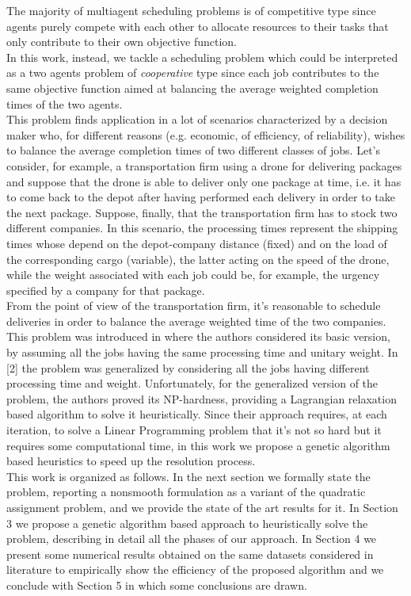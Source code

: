 \documentclass[opre,nonblindrev]{informs3} %
\begin{document}
 The majority of multiagent scheduling problems is of competitive type since agents purely compete with each other to allocate resources to their tasks that only contribute to their own objective function.\\ In this work, instead, we tackle a scheduling problem which could be interpreted as a two agents problem of \textit{cooperative} type since each job contributes to the same objective function aimed at balancing the average weighted completion times of the two agents.\\
This problem finds application in a lot of scenarios characterized by a decision maker who, for different reasons (e.g. economic, of efficiency, of reliability), wishes to balance the average completion times of two different classes of jobs. Let’s consider, for example, a transportation firm using a drone for delivering packages and suppose that the drone is able to deliver only one package at time, i.e. it has to come back to the depot after having performed each delivery in order to take the next package. Suppose, finally, that the transportation firm has to stock two different companies. In this scenario, the processing times represent the shipping times whose depend on the depot-company distance (fixed) and on the load of the corresponding cargo (variable), the latter acting on the speed of the drone, while the weight associated with each job could be, for example, the urgency specified by a company for that package.\\ From the point of view of the transportation firm, it’s reasonable to schedule deliveries in order to balance the average weighted time of the two companies. \\
This problem was introduced in \cite{av-fud20} where the authors considered its basic version, by assuming all the jobs having the same processing time and unitary weight. In [2] the problem was generalized by considering all the jobs having different processing time and weight. Unfortunately, for the generalized version of the problem, the authors proved its NP-hardness, providing a Lagrangian relaxation based algorithm to solve it heuristically. Since their approach requires, at each iteration, to solve a Linear Programming problem that it's not so hard but it requires some computational time, in this work we propose a genetic algorithm based heuristics to speed up the resolution process.\\
This work is organized as follows. In the next section we formally state the problem, reporting a nonsmooth formulation as a variant of the quadratic assignment problem, and we provide the state of the art results for it. In Section 3 we propose a genetic algorithm based approach to heuristically solve the problem, describing in detail all the phases of our approach. In Section 4 we present some numerical results obtained on the same datasets considered in literature to empirically show the efficiency of the proposed algorithm and we conclude with Section 5 in which some conclusions are drawn.
\end{document}
